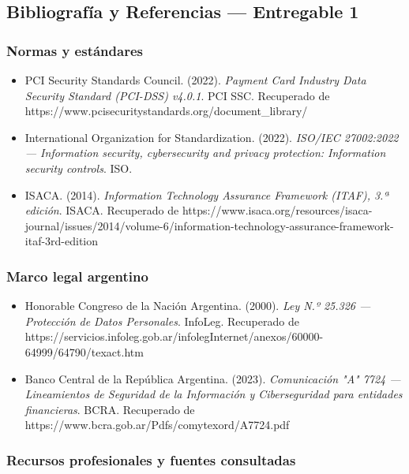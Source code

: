 \documentclass[11pt,a4paper]{article}
\begin{document}
\subsection{Bibliografía y Referencias — Entregable 1}

\subsubsection{Normas y estándares}

\begin{itemize}[leftmargin=*]
  \item PCI Security Standards Council. (2022). \textit{Payment Card Industry Data Security Standard (PCI-DSS) v4.0.1}. PCI SSC. Recuperado de https://www.pcisecuritystandards.org/document_library/
  \item International Organization for Standardization. (2022). \textit{ISO/IEC 27002:2022 — Information security, cybersecurity and privacy protection: Information security controls}. ISO.
  \item ISACA. (2014). \textit{Information Technology Assurance Framework (ITAF), 3.ª edición}. ISACA. Recuperado de https://www.isaca.org/resources/isaca-journal/issues/2014/volume-6/information-technology-assurance-framework-itaf-3rd-edition
\end{itemize}

\subsubsection{Marco legal argentino}

\begin{itemize}[leftmargin=*]
  \item Honorable Congreso de la Nación Argentina. (2000). \textit{Ley N.º 25.326 — Protección de Datos Personales}. InfoLeg. Recuperado de https://servicios.infoleg.gob.ar/infolegInternet/anexos/60000-64999/64790/texact.htm
  \item Banco Central de la República Argentina. (2023). \textit{Comunicación "A" 7724 — Lineamientos de Seguridad de la Información y Ciberseguridad para entidades financieras}. BCRA. Recuperado de https://www.bcra.gob.ar/Pdfs/comytexord/A7724.pdf
\end{itemize}

\subsubsection{Recursos profesionales y fuentes consultadas}
\end{document}
